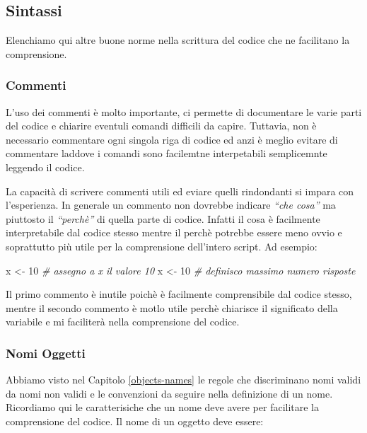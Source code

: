 \documentclass[
]{book}
\newenvironment{Shaded}{\begin{snugshade}}{\end{snugshade}}
\newcommand{\CommentTok}[1]{\textcolor[rgb]{0.56,0.35,0.01}{\textit{#1}}}
\newcommand{\DecValTok}[1]{\textcolor[rgb]{0.00,0.00,0.81}{#1}}
\newcommand{\NormalTok}[1]{#1}
\newcommand{\StringTok}[1]{\textcolor[rgb]{0.31,0.60,0.02}{#1}}
\begin{document}
\hypertarget{sintax}{%
\subsection{Sintassi}\label{sintax}}

Elenchiamo qui altre buone norme nella scrittura del codice che ne facilitano la comprensione.

\hypertarget{commenti}{%
\subsubsection*{Commenti}\label{commenti}}

L'uso dei commenti è molto importante, ci permette di documentare le varie parti del codice e chiarire eventuli comandi difficili da capire. Tuttavia, non è necessario commentare ogni singola riga di codice ed anzi è meglio evitare di commentare laddove i comandi sono facilemtne interpetabili semplicemnte leggendo il codice.

La capacità di scrivere commenti utili ed eviare quelli rindondanti si impara con l'esperienza. In generale un commento non dovrebbe indicare \emph{``che cosa''} ma piuttosto il \emph{``perchè''} di quella parte di codice. Infatti il cosa è facilmente interpretabile dal codice stesso mentre il perchè potrebbe essere meno ovvio e soprattutto più utile per la comprensione dell'intero script. Ad esempio:

\begin{Shaded}
\begin{Highlighting}[]
\NormalTok{x <-}\StringTok{ }\DecValTok{10} \CommentTok{# assegno a x il valore 10}
\NormalTok{x <-}\StringTok{ }\DecValTok{10} \CommentTok{# definisco massimo numero risposte}
\end{Highlighting}
\end{Shaded}

Il primo commento è inutile poichè è facilmente comprensibile dal codice stesso, mentre il secondo commento è motlo utile perchè chiarisce il significato della variabile e mi faciliterà nella comprensione del codice.

\hypertarget{nomi-oggetti}{%
\subsubsection*{Nomi Oggetti}\label{nomi-oggetti}}

Abbiamo visto nel Capitolo \ref{objects-names} le regole che discriminano nomi validi da nomi non validi e le convenzioni da seguire nella definizione di un nome. Ricordiamo qui le caratterisiche che un nome deve avere per facilitare la comprensione del codice. Il nome di un oggetto deve essere:
\end{document}
